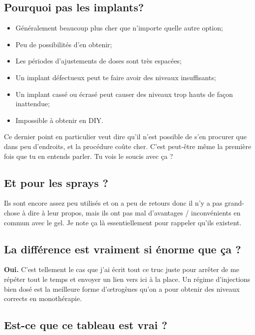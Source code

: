 \documentclass{article}
\begin{document}
\subsection{Pourquoi pas les implants?}

\begin{itemize}
  \item Généralement beaucoup plus cher que n'importe quelle autre option;
  \item Peu de possibilités d'en obtenir;
  \item Les périodes d'ajustements de doses sont très espacées;
  \item Un implant défectueux peut te faire avoir des niveaux insuffisants;
  \item Un implant cassé ou écrasé peut causer des niveaux trop hauts de façon inattendue;
  \item Impossible à obtenir en DIY.
\end{itemize}

Ce dernier point en particulier veut dire qu'il n'est possible de s'en procurer que dans peu d'endroits, et la procédure coûte cher. C'est peut-être même la première fois que tu en entends parler. Tu vois le soucis avec ça ?

\subsection{Et pour les sprays ?}

Ils sont encore assez peu utilisés et on a peu de retours donc il n'y a pas grand-chose à dire à leur propos, mais ils ont pas mal d'avantages / inconvénients en commun avec le gel. Je note ça là essentiellement pour rappeler qu'ils existent.

\subsection{La différence est vraiment si énorme que ça ?}

\textbf{Oui.} C'est tellement le cas que j'ai écrit tout ce truc juste pour arrêter de me répéter tout le temps et envoyer un lien vers ici à la place. Un régime d'injections bien dosé est la meilleure forme d'œtrogènes qu'on a pour obtenir des niveaux corrects en monothérapie.

\subsection{Est-ce que ce tableau est vrai ?}\label{1-12}
\end{document}
